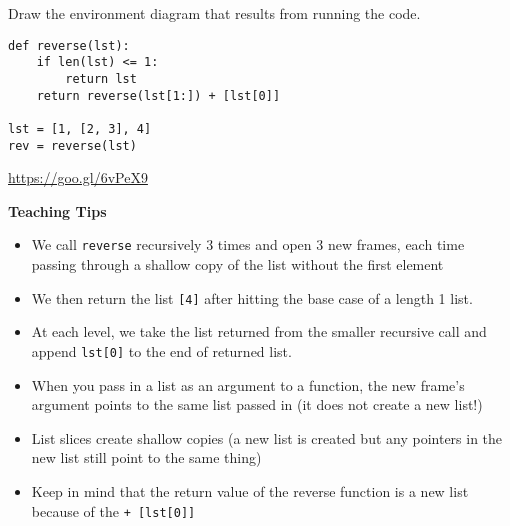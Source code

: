 \begin{blocksection}
\question Draw the environment diagram that results from running the code.

\begin{lstlisting}
def reverse(lst):
    if len(lst) <= 1:
        return lst
    return reverse(lst[1:]) + [lst[0]]

lst = [1, [2, 3], 4]
rev = reverse(lst)
\end{lstlisting}

\begin{solution}[2in]
\url{https://goo.gl/6vPeX9}
\end{solution}
\end{blocksection}

\begin{guide}
\begin{blocksection}
\textbf{Teaching Tips}
\begin{itemize}
    \item We call \lstinline{reverse} recursively 3 times and open 3 new frames, each time passing through a shallow copy of the list without the first element
    \item We then return the list \lstinline{[4]} after hitting the base case of a length 1 list.
    \item At each level, we take the list returned from the smaller recursive call and append \lstinline{lst[0]} to the end of returned list.
    \item When you pass in a list as an argument to a function, the new frame’s argument points to the same list passed in (it does not create a new list!)
    \item List slices create shallow copies (a new list is created but any pointers in the new list still point to the same thing)
    \item Keep in mind that the return value of the reverse function is a new list because of the \lstinline{+ [lst[0]]}
\end{itemize}
\end{blocksection}
\end{guide}
